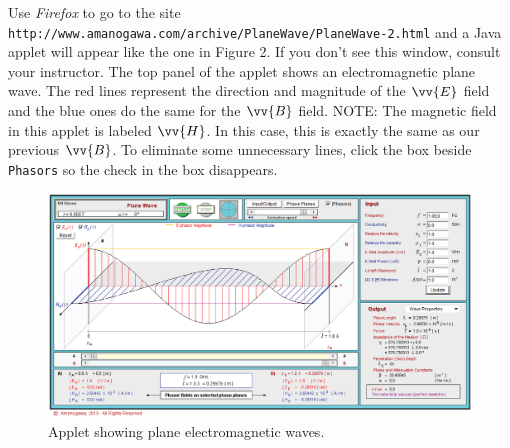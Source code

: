 Use \textit{Firefox} to go to the site
\verb!http://www.amanogawa.com/archive/PlaneWave/PlaneWave-2.html! and a Java applet will appear 
like the one in Figure 2. 
If you don't see this window, consult your instructor.
The top panel of the applet shows an electromagnetic plane wave.
The red lines represent the direction and magnitude of the $\vv {E}$ field and the
blue ones do the same for the $\vv {B}$ field.
NOTE: The magnetic field in this applet is labeled $\vv {H}$.
In this case, this is exactly the same as our previous $\vv {B}$.
To eliminate some unnecessary lines, click the box beside \texttt{Phasors} so the check in the box 
disappears.
\begin{figure}[hbt]
\begin{center}
\includegraphics[width=5.0in]{plane_waves/plane_wave_screenshot.eps}
\caption{Applet showing plane electromagnetic waves.}
\end{center}
\end{figure}
\vspace{-0.3in}

\pagebreak[2]

